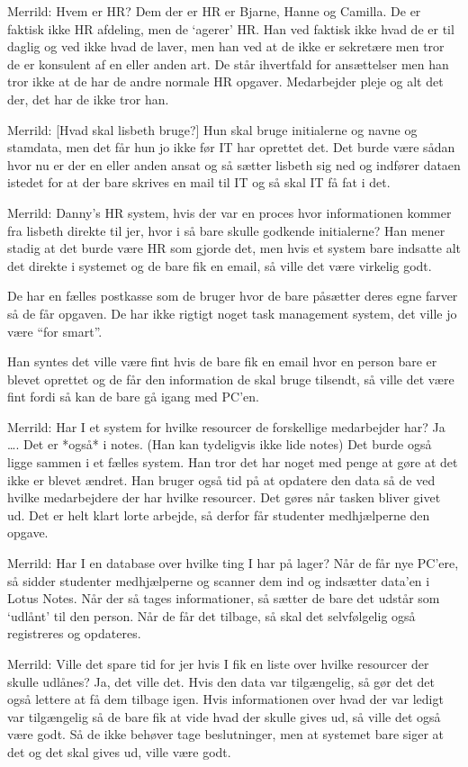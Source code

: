 Merrild: Hvem er HR?
Dem der er HR er Bjarne, Hanne og Camilla. De er faktisk ikke HR afdeling, men de ‘agerer’ HR. Han ved faktisk ikke hvad de er til daglig og ved ikke hvad de laver, men han ved at de ikke er sekretære men tror de er konsulent af en eller anden art. De står ihvertfald for ansættelser men han tror ikke at de har de andre normale HR opgaver. Medarbejder pleje og alt det der, det har de ikke tror han. 

Merrild: [Hvad skal lisbeth bruge?]
Hun skal bruge initialerne og navne og stamdata, men det får hun jo ikke før IT har oprettet det. 
Det burde være sådan hvor nu er der en eller anden ansat og så sætter lisbeth sig ned og indfører dataen istedet for at der bare skrives en mail til IT og så skal IT få fat i det. 

Merrild: Danny’s HR system, hvis der var en proces hvor informationen kommer fra lisbeth direkte til jer, hvor i så bare skulle godkende initialerne?
Han mener stadig at det burde være HR som gjorde det, men hvis et system bare indsatte alt det direkte i systemet og de bare fik en email, så ville det være virkelig godt.

De har en fælles postkasse som de bruger hvor de bare påsætter deres egne farver så de får opgaven. De har ikke rigtigt noget task management system, det ville jo være “for smart”. 

Han syntes det ville være fint hvis de bare fik en email hvor en person bare er blevet oprettet og de får den information de skal bruge tilsendt, så ville det være fint fordi så kan de bare gå igang med PC’en.

Merrild: Har I et system for hvilke resourcer de forskellige medarbejder har?
Ja …. Det er *også* i notes. (Han kan tydeligvis ikke lide notes) Det burde også ligge sammen i et fælles system. Han tror det har noget med penge at gøre at det ikke er blevet ændret. 
Han bruger også tid på at opdatere den data så de ved hvilke medarbejdere der har hvilke resourcer. Det gøres når tasken bliver givet ud. Det er helt klart lorte arbejde, så derfor får studenter medhjælperne den opgave. 

Merrild: Har I en database over hvilke ting I har på lager?
Når de får nye PC’ere, så sidder studenter medhjælperne og scanner dem ind og indsætter data’en i Lotus Notes. Når der så tages informationer, så sætter de bare det udstår som ‘udlånt’ til den person. Når de får det tilbage, så skal det selvfølgelig også registreres og opdateres. 

Merrild: Ville det spare tid for jer hvis I fik en liste over hvilke resourcer der skulle udlånes?
Ja, det ville det. Hvis den data var tilgængelig, så gør det det også lettere at få dem tilbage igen. Hvis informationen over hvad der var ledigt var tilgængelig så de bare fik at vide hvad der skulle gives ud, så ville det også være godt. Så de ikke behøver tage beslutninger, men at systemet bare siger at det og det skal gives ud, ville være godt.

